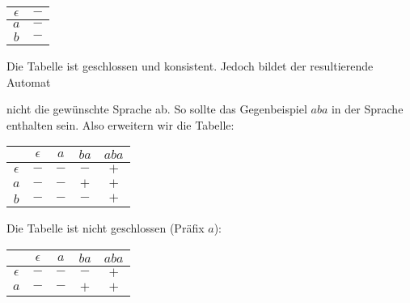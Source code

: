 \documentclass[11pt,a4paper]{article}
\begin{document}
{{\begin{loesung}
\begin{enumerate}
\begin{table}[h!]
\begin{tabular}{c|c}
                \hline
                $\epsilon$ & $-$ \\
                \hline
                $a$ & $-$ \\
                $b$ & $-$ \\
            \end{tabular}
        \end{table}
        \FloatBarrier
        Die Tabelle ist geschlossen und konsistent.
        Jedoch bildet der resultierende Automat
        \begin{figure*}[h!]
            \centering
        \end{figure*}
        \FloatBarrier
        nicht die gewünschte Sprache ab. So sollte das Gegenbeispiel $aba$ in der Sprache enthalten sein.
        Also erweitern wir die Tabelle:
        \begin{table}[h!]
            \centering
            \begin{tabular}{c|cccc}
                & $\epsilon$ & $a$ & $ba$ & $aba$ \\
                \hline
                $\epsilon$ & $-$ & $-$ & $-$ & $+$ \\
                \hline
                $a$ & $-$ & $-$ & $+$ & $+$ \\
                $b$ & $-$ & $-$ & $-$ & $+$ \\
            \end{tabular}
        \end{table}
        \FloatBarrier
        Die Tabelle ist nicht geschlossen (Präfix $a$):
        \begin{table}[h!]
            \centering
            \begin{tabular}{c|cccc}
                & $\epsilon$ & $a$ & $ba$ & $aba$ \\
                \hline
                $\epsilon$ & $-$ & $-$ & $-$ & $+$ \\
                $a$ & $-$ & $-$ & $+$ & $+$ \\

\end{tabular}
\end{table}
\end{enumerate}
\end{loesung}}}
\end{document}
